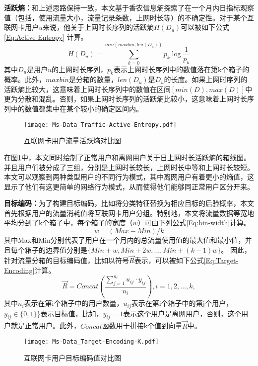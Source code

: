 \textbf{活跃熵：}和上述思路保持一致，本文基于香农信息熵探索了在一个月内日指标观察值（包括，使用流量大小，流量记录条数，上网时长等）的不确定性。对于某个互联网卡用户$u$来说，他关于上网时长序列的活跃熵$H(D_{u})$可以被如下公式\eqref{Eq:Active-Entropy} 计算。
\begin{equation}
	H(D_{u}) = \sum_{k=0}^{min(maxbin, len(D_{u}))} p_{k} \log \frac{1}{p_{k}}
	\label{Eq:Active-Entropy}
\end{equation}
其中$D_{u}$是用户$u$的上网时长序列，$p_{k}$表示上网时长序列中的数值落在第k个箱子的概率。此外，$maxbin$是分箱的数量，$len(D_{u})$是$D_{u}$的长度。如果上网时序列的活跃熵比较大，这意味着上网时长序列中的数值在区间$[min(D),max(D)]$中更为分散和混乱。否则，如果上网时长序列的活跃熵比较小，这意味着上网时长序列中的数值都集中在某个较小的确定区间内。
\begin{figure}[hbt]
	\centering
	\texttt{[image: Ms-Data\_Traffic-Active-Entropy.pdf]}
	\caption{互联网卡用户流量活跃熵对比图}
	\label{Active-Entropy}
\end{figure}

在图\ref{Active-Entropy}中，本文同时绘制了正常用户和离网用户关于日上网时长活跃熵的箱线图。并且用户们被分成了三组，分别是上网时长较长，上网时长中等和上网时长较短。本文可以观察到两种类型用户的不同行为模式，其中离网用户有着更小的熵值，这显示了他们有这更简单的网络行为模式，从而使得他们能够同正常用户区分开来。


\textbf{目标编码：}为了构建目标编码，比如将分类特征替换为相应目标的后验概率，本文首先根据用户的流量消耗值将互联网卡用户分组。特别地，本文将流量数据等宽地平均分到了k个箱子中，每个箱子的宽度（$w$）可由下列公式\eqref{Eq:bin-width}计算。
\begin{equation}
	w = (Max-Min)/k
	\label{Eq:bin-width}
\end{equation}
其中Max和Min分别代表了用户在一个月内的总流量使用值的最大值和最小值，并且每个箱子的边界值分别是$\{Min+w,Min+2w,...,Min+(k-1)w\}$。
因此，针对流量分箱的目标编码值，比如以符号$\vec{R}$表示，可以被如下公式\eqref{Eq:Target-Encoding}计算。
\begin{equation}
	\vec{R} = Concat(\frac{\sum_{j=1}^{n_{i}}u_{ij} \cdot y_{ij}}{n_{i}}), i=1,2,...,k,
	\label{Eq:Target-Encoding}
\end{equation}
其中$n_{i}$表示在第i个箱子中的用户数量，$u_{ij}$表示在第i个箱子中的第j个用户，$y_{ij} \in \{0,1 \}\}$表示目标值，比如，$y_{ij}=1$表示这个用户是离网用户，否则，这个用户就是正常用户。此外，$Concat$函数用于拼接k个值到向量$\vec{R}$中。
\begin{figure}[hbt]
	\centering
	\texttt{[image: Ms-Data\_Target-Encoding-K.pdf]}
	\caption{互联网卡用户目标编码值对比图}
	\label{Fig:Target-Encoding-K}
\end{figure}


